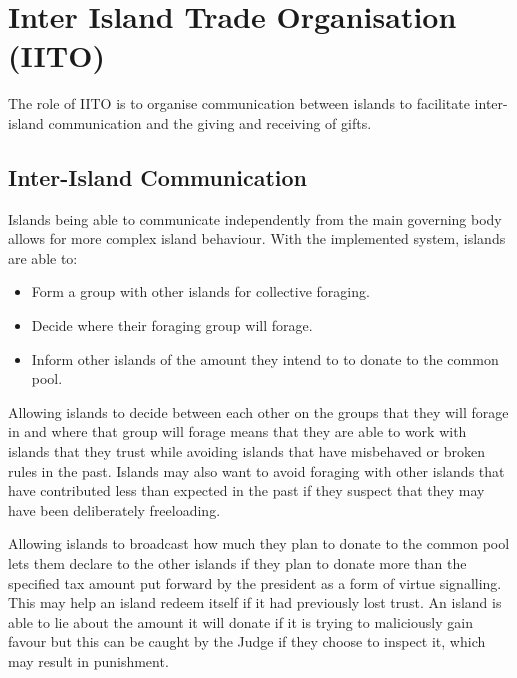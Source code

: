 \chapter{Inter Island Trade Organisation (IITO)}

The role of IITO is to organise communication between islands to facilitate inter-island communication and the giving and receiving of gifts.


\section{Inter-Island Communication}  
\label{sec:IITO:inter_island_communication}  


Islands being able to communicate independently from the main governing body allows for more complex island behaviour. With the implemented system, islands are able to:

\begin{itemize}
    \item Form a group with other islands for collective foraging.
    \item Decide where their foraging group will forage.
    \item Inform other islands of the amount they intend to to donate to the common pool.
\end{itemize}

Allowing islands to decide between each other on the groups that they will forage in and where that group will forage means that they are able to work with islands that they trust while avoiding islands that have misbehaved or broken rules in the past. Islands may also want to avoid foraging with other islands that have contributed less than expected in the past if they suspect that they may have been deliberately freeloading.

Allowing islands to broadcast how much they plan to donate to the common pool lets them declare to the other islands if they plan to donate more than the specified tax amount put forward by the president as a form of virtue signalling. This may help an island redeem itself if it had previously lost trust. An island is able to lie about the amount it will donate if it is trying to maliciously gain favour but this can be caught by the Judge if they choose to inspect it, which may result in punishment.

